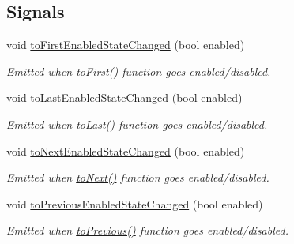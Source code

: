\subsection*{Signals}
\begin{DoxyCompactItemize}
\item 
void \hyperlink{classmdt_sql_data_widget_controller_ab46f8f8b1eb8f2e46a115b9a73f13fbc}{to\-First\-Enabled\-State\-Changed} (bool enabled)
\begin{DoxyCompactList}\small\item\em Emitted when \hyperlink{classmdt_sql_data_widget_controller_ac1b3036261ef9c3957b23aa1b5145a77}{to\-First()} function goes enabled/disabled. \end{DoxyCompactList}\item 
void \hyperlink{classmdt_sql_data_widget_controller_abcf08c489f908b180d2f10bda6c0f738}{to\-Last\-Enabled\-State\-Changed} (bool enabled)
\begin{DoxyCompactList}\small\item\em Emitted when \hyperlink{classmdt_sql_data_widget_controller_a9303e2e10025d9c4c41c4e00e6b804f5}{to\-Last()} function goes enabled/disabled. \end{DoxyCompactList}\item 
void \hyperlink{classmdt_sql_data_widget_controller_affaa268b3c1ab9db67c97f8b2dce37c4}{to\-Next\-Enabled\-State\-Changed} (bool enabled)
\begin{DoxyCompactList}\small\item\em Emitted when \hyperlink{classmdt_sql_data_widget_controller_a3b7f53030358f3598b8de769f14ad597}{to\-Next()} function goes enabled/disabled. \end{DoxyCompactList}\item 
void \hyperlink{classmdt_sql_data_widget_controller_a37fcddb456a135a0748a892918d6eee3}{to\-Previous\-Enabled\-State\-Changed} (bool enabled)
\begin{DoxyCompactList}\small\item\em Emitted when \hyperlink{classmdt_sql_data_widget_controller_a5fd979fc55228bf7d74bf50d1bb34356}{to\-Previous()} function goes enabled/disabled. \end{DoxyCompactList}\end{DoxyCompactItemize}
